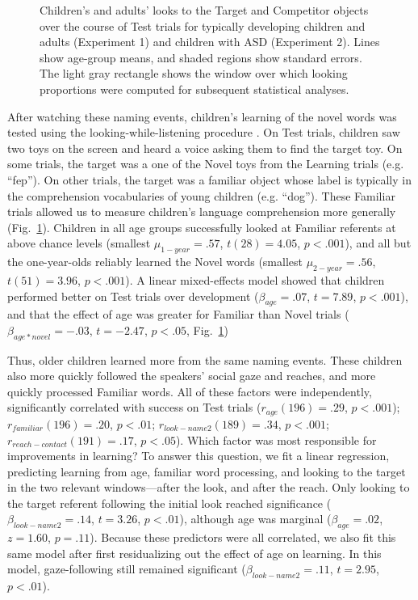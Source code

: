 \documentclass[man,floatsintext]{apa6}
\begin{document}
\begin{figure}[tb]
	\caption{\label{fig:reflook_timecourse}Children's and adults' looks to the Target and Competitor objects over the course of Test trials for typically developing children and adults (Experiment 1) and children with ASD (Experiment 2). Lines show age-group means, and shaded regions show standard errors. The light gray rectangle shows the window over which looking proportions were computed for subsequent statistical analyses.}
\end{figure}

After watching these naming events, children's learning of the novel words was tested using the looking-while-listening procedure \cite{fernald1998, fernald2008}. On Test trials, children saw two toys on the screen and heard a voice asking them to find the target toy. On some trials, the target was a one of the Novel toys from the Learning trials (e.g. ``fep''). On other trials, the target was a familiar object whose label is typically in the comprehension vocabularies of young children (e.g. ``dog''). These Familiar trials allowed us to measure children's language comprehension more generally (Fig.~\ref{fig:reflook_timecourse}). Children in all age groups successfully looked at Familiar referents at above chance levels (smallest $\mu_{1-year} = .57$, $t(28) = 4.05$, $p < .001$), and all but the one-year-olds reliably learned the Novel words (smallest $\mu_{2-year} = .56$, $t(51) = 3.96$, $p < .001$). A linear mixed-effects model showed that children performed better on Test trials over development ($\beta_{age} = .07$, $t = 7.89$, $p < .001$), and that the effect of age was greater for Familiar than Novel trials ($\beta_{age * novel} = -.03$, $t = -2.47$, $p < .05$, Fig.~\ref{fig:reflook_timecourse})

Thus, older children learned more from the same naming events. These children also more quickly followed the speakers' social gaze and reaches, and more quickly processed Familiar words. All of these factors were independently, significantly correlated with success on Test trials ($r_{age}(196) = .29$, $p < .001$); $r_{familiar}(196) = .20$, $p < .01$; $r_{look-name2}(189) = .34$, $p < .001$; $r_{reach-contact}(191) = .17$, $p < .05$). Which factor was most responsible for improvements in learning? To answer this question, we fit a linear regression, predicting learning from age, familiar word processing, and looking to the target in the two relevant windows---after the look, and after the reach. Only looking to the target referent following the initial look reached significance ($\beta_{look-name2} = .14$, $t = 3.26$, $p < .01$), although age was marginal ($\beta_{age} = .02$, $z = 1.60$, $p = .11$). Because these predictors were all correlated, we also fit this same model after first residualizing out the effect of age on learning. In this model, gaze-following still remained significant ($\beta_{look-name2} = .11$, $t = 2.95$, $p < .01$).
\end{document}

